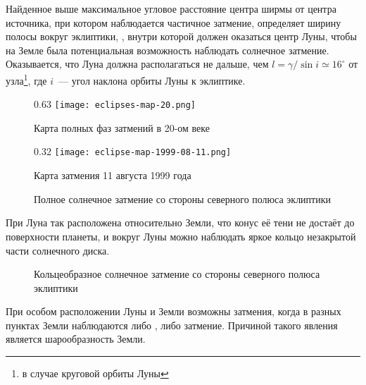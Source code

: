 \begin{wrapfigure}[7]{r}{0.37\tw}
    \centering
    \vspace{-1pc}
    
    \caption{}
    \label{pic:elipses-node-distance}    
\end{wrapfigure}
Найденное выше максимальное угловое расстояние центра ширмы от центра источника, при котором наблюдается частичное затмение, определяет ширину полосы вокруг эклиптики, , внутри которой должен оказаться центр Луны, чтобы на Земле была потенциальная возможность наблюдать солнечное затмение. Оказывается, что Луна должна располагаться не дальше, чем $l = \gamma / \sin i \simeq 16^\circ$ от узла\footnote{в случае круговой орбиты Луны}, где $i$~--- угол наклона орбиты Луны к эклиптике. 

\begin{figure}[h!]
    \begin{subcaptionblock}[t]{0.63\tw}
        \texttt{[image: eclipses-map-20.png]}
        \caption{Карта полных фаз затмений в 20-ом веке}
        \label{pic:eclipse-20-century}
    \end{subcaptionblock}
    \hfill
    \begin{subcaptionblock}[t]{0.32\tw}
        \texttt{[image: eclipse-map-1999-08-11.png]}
        \caption{Карта затмения 11 августа 1999 года}
        \label{pic:eclipse-1999-08-11}
    \end{subcaptionblock}
    \caption{}
\end{figure}

\begin{figure}[h!]
    \centering
    \vspace{-.5pc}
    
    \caption{Полное солнечное затмение со стороны северного полюса эклиптики}
    \label{fig:eclipses-full-solar-eslipse}
\end{figure}
При  Луна так расположена относительно Земли, что конус её тени не достаёт до поверхности планеты, и вокруг Луны можно наблюдать яркое кольцо незакрытой части солнечного диска.

\begin{figure}[h!]
    \centering
    
    \caption{Кольцеобразное солнечное затмение со стороны северного полюса эклиптики}
    \label{fig:eclipses-circle-solar-eslipse}
\end{figure}
При особом расположении Луны и Земли возможны  затмения, когда в разных пунктах Земли наблюдаются либо , либо  затмение. Причиной такого явления является шарообразность Земли.

